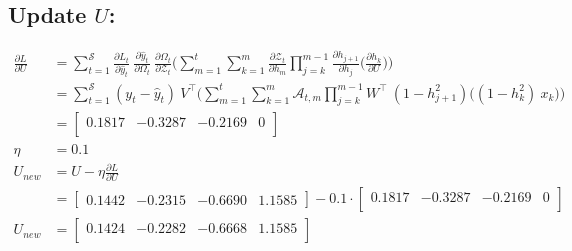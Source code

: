 \documentclass{article}
\begin{document}
\subsection{Update $U$:}
\begin{align*}
\frac{\partial L}{ \partial{U}} &= \sum_{t=1}^{\mathcal{S}}
\frac{\partial L_t}{\partial \hat{y}_t}~\frac{\partial \hat{y}_t}{\partial \Omega_t}~\frac{\partial \Omega_t}{ \partial \mathcal{Z}_t} \biggl( 
\sum_{m=1}^{t}
\sum_{k=1}^{m} \frac{\partial \mathcal{Z}_t}{ \partial h_m} 
\prod_{j=k}^{m-1} \frac{\partial h_{j+1}}{ \partial h_j} 
\biggl( \frac{\partial h_k}{ \partial U} \biggl) \biggl) \\
  &= 
\sum_{t=1}^{\mathcal{S}}
(y_t - \hat{y}_t)~V^\top \biggl( 
\sum_{m=1}^{t}
\sum_{k=1}^{m} \mathcal{A}_{t,m} 
\prod_{j=k}^{m-1} W^\top ~ (1 - h_{j+1}^2)
\biggl( (1-h_k^2)~ x_{k} \biggl) \biggl) \\
    &= \begin{bmatrix}
0.1817 & -0.3287 & -0.2169 & 0 \\
\end{bmatrix}\\
\eta &= 0.1\\
U_{new} &= U - \eta \frac{\partial L}{\partial U}\\
&=\begin{bmatrix}
    0.1442 & -0.2315 & -0.6690 & 1.1585
\end{bmatrix} - 0.1 \cdot \begin{bmatrix}
0.1817 & -0.3287 & -0.2169 & 0 \\
\end{bmatrix}\\
U_{new} &= \begin{bmatrix}
0.1424 & -0.2282 & -0.6668 & 1.1585 \\
\end{bmatrix}
\end{align*}
\end{document}

